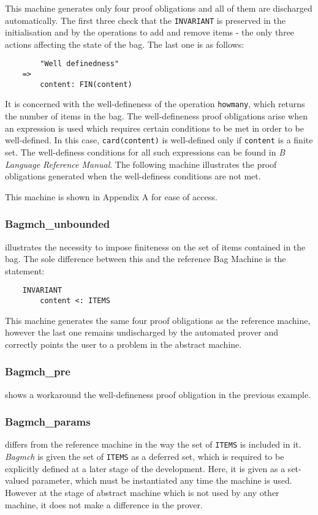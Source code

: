 \documentclass[11pt,journal]{IEEEtran}
\begin{document}
	This machine generates only four proof obligations and all of them are discharged automatically. The first three check that the \texttt{INVARIANT} is preserved in the initialisation and by the operations to add and remove items - the only three actions affecting the state of the bag. The last one is as follows:
	
	\begin{lstlisting}
		"Well definedness" 
	=> 
		content: FIN(content)
	\end{lstlisting}
	
	It is concerned with the well-defineness of the operation \texttt{howmany}, which returns the number of items in the bag. The well-defineness proof obligations arise when an expression is used which requires certain conditions to be met in order to be well-defined. In this case, \texttt{card(content)} is well-defined only if \texttt{content} is a finite set. The well-definess conditions for all such expressions can be found in \emph{B Language Reference Manual}\cite{b reference}. The following machine illustrates the proof obligations generated when the well-definess conditions are not met.
	
	This machine is shown in Appendix A for ease of access.
	
	\subsubsection{Bagmch\_unbounded} illustrates the necessity to impose finiteness on the set of items contained in the bag. The sole difference between this and the reference Bag Machine is the statement:
	
	\begin{lstlisting}
	INVARIANT
		content <: ITEMS
	\end{lstlisting}
	This machine generates the same four proof obligations as the reference machine, however the last one remains undischarged by the automated prover and correctly points the user to a problem in the abstract machine. 
	
	\subsubsection{Bagmch\_pre} shows a workaround the well-defineness proof obligation in the previous example. 
	
	\subsubsection{Bagmch\_params} differs from the reference machine in the way the set of \texttt{ITEMS} is included in it. \emph{Bagmch} is given the set of \texttt{ITEMS} as a deferred set, which is required to be explicitly defined at a later stage of the development. Here, it is given as a set-valued parameter, which must be instantiated any time the machine is used.\cite{b-method} However at the stage of abstract machine which is not used by any other machine, it does not make a difference in the prover.
	
\end{document}
